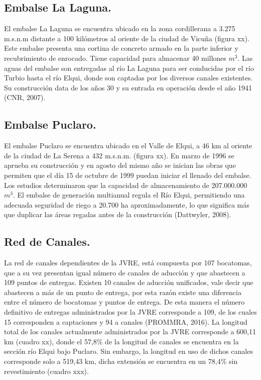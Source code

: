 \documentclass[11pt,]{article}
\begin{document}
\subsection{Embalse La Laguna.} %
El embalse La Laguna se encuentra ubicado en la zona cordillerana a 3.275 m.s.n.m distante a 100 kilómetros al oriente de la ciudad de Vicuña (figura xx). Este embalse presenta una cortina de concreto armado en la parte inferior y recubrimiento de enrocado. Tiene capacidad para almacenar 40 millones $m^3$. Las aguas del embalse son entregadas al río La Laguna para ser conducidas por el río Turbio hasta el río Elqui, donde son captadas por los diversos canales existentes. Su construcción data de los años 30 y su entrada en operación desde el año 1941  (CNR, 2007).

\subsection{Embalse Puclaro.}%
El embalse Puclaro se encuentra ubicado en el Valle de Elqui, a 46 km al oriente de la ciudad de La Serena a 432 m.s.n.m. (figura xx).
En marzo de 1996 se aprueba su construcción y en agosto del mismo año se inician las obras que permiten que el día 15 de octubre de 1999 puedan iniciar el llenado del embalse. Los estudios determinaron que la capacidad de almacenamiento de 207.000.000 $m^3$.
El embalse de generación multianual regula el Río Elqui, permitiendo una adecuada seguridad de riego a 20.700 ha aproximadamente, lo que significa más que duplicar las áreas regadas antes de la construcción (Dattwyler, 2008).

\subsection{Red de Canales.}
La red de canales dependientes de la JVRE, está compuesta por 107 bocatomas, que a su vez presentan igual número de canales de aducción y que abastecen a 109 puntos de entregas. Existen 10 canales de aducción unificados, vale decir que abastecen a más de un punto de entrega, por esta razón existe una diferencia entre el número de bocatomas y puntos de entrega. De esta manera el número definitivo de entregas administrados por la JVRE corresponde a 109, de los cuales 15 corresponden a captaciones y 94 a canales (PROMMRA, 2016).
La longitud total de los canales actualmente administrados por la JVRE corresponde a 600,11 km (cuadro xx), donde el 57,8\% de la longitud de canales se encuentra en la sección río Elqui bajo Puclaro. Sin embargo, la longitud en uso de dichos canales corresponde solo a  519,43 km, dicha extensión se encuentra en un 78,4\% sin revestimiento (cuadro xxx).\\
\end{document}
